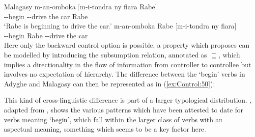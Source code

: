 \documentclass[output=paper,hidelinks]{langscibook}
\begin{document}
\ea\label{ex:Control:49}Malagasy
\ea\label{ex:Control:49a}\gll  m-an-omboka   [m-i-tondra    ny  fiara Rabe]\\
\PRS--begin \PRS--drive  the car Rabe\\
\glt`Rabe is beginning to drive the car.'
\ex\label{ex:Control:49b}\gll  *m-an-omboka  Rabe  [m-i-tondra    ny  fiara]\\
\PRS--begin Rabe   \PRS--drive  the car\\
\z\z
Here only the backward control option is possible, a property which \citet{sellssubsump} proposes can be modelled by introducing the subsumption relation, annotated as $\sqsubseteq$, which implies a directionality in the flow of information from controller to controllee but involves no expectation of hierarchy. The difference between the `begin' verbs in Adyghe and Malagasy can then be represented as in (\ref{ex:Control:50}):

\ea\label{ex:Control:50}
\ea\label{ex:Control:50a}  
\ex\label{ex:Control:50b}  
\z\z

This kind of cross-linguistic difference is part of a larger typological distribution.  , adapted from \citet[278]{polipots02}, shows the various patterns which have been attested to date for verbs meaning `begin', which fall within the larger class of verbs with an aspectual meaning, something which seems to be a key factor here.

\begin{table}
\caption{Typology of backward control with `begin'}\label{table:Control:3}
\end{table}
\end{document}

